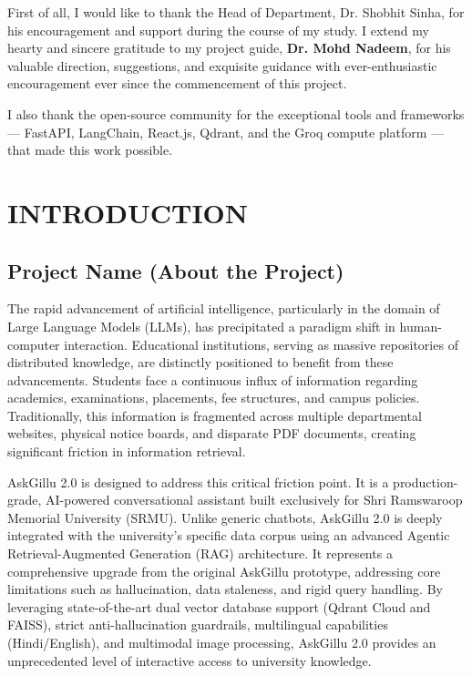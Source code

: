 \documentclass[12pt,a4paper]{report}
\begin{document}
First of all, I would like to thank the Head of Department, Dr. Shobhit Sinha, for his encouragement and support during the course of my study. I extend my hearty and sincere gratitude to my project guide, \textbf{Dr. Mohd Nadeem}, for his valuable direction, suggestions, and exquisite guidance with ever-enthusiastic encouragement ever since the commencement of this project.

I also thank the open-source community for the exceptional tools and frameworks --- FastAPI, LangChain, React.js, Qdrant, and the Groq compute platform --- that made this work possible.

\clearpage

\tableofcontents
\clearpage
\listoffigures
\clearpage
\listoftables
\clearpage


\chapter{INTRODUCTION}

\section{Project Name (About the Project)}
The rapid advancement of artificial intelligence, particularly in the domain of Large Language Models (LLMs), has precipitated a paradigm shift in human-computer interaction. Educational institutions, serving as massive repositories of distributed knowledge, are distinctly positioned to benefit from these advancements. Students face a continuous influx of information regarding academics, examinations, placements, fee structures, and campus policies. Traditionally, this information is fragmented across multiple departmental websites, physical notice boards, and disparate PDF documents, creating significant friction in information retrieval. 

AskGillu 2.0 is designed to address this critical friction point. It is a production-grade, AI-powered conversational assistant built exclusively for Shri Ramswaroop Memorial University (SRMU). Unlike generic chatbots, AskGillu 2.0 is deeply integrated with the university's specific data corpus using an advanced Agentic Retrieval-Augmented Generation (RAG) architecture. It represents a comprehensive upgrade from the original AskGillu prototype, addressing core limitations such as hallucination, data staleness, and rigid query handling. By leveraging state-of-the-art dual vector database support (Qdrant Cloud and FAISS), strict anti-hallucination guardrails, multilingual capabilities (Hindi/English), and multimodal image processing, AskGillu 2.0 provides an unprecedented level of interactive access to university knowledge.
\end{document}
